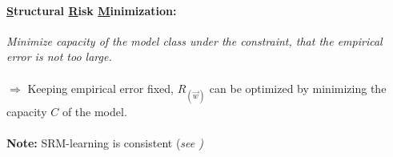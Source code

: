 \paragraph{\underline{S}tructural \underline{R}isk \underline{M}inimization:}
\emph{Minimize capacity of the model class under the constraint, that the empirical error is not too large.}\\\\
$\Rightarrow$ Keeping empirical error fixed, $R_{(\vec{w})}$ can be optimized by minimizing the capacity $C$ of the model. 
\\\\
\textbf{Note:} SRM-learning is consistent ({\it see \cite[ch.~6.3]{Vapnik1998})}


